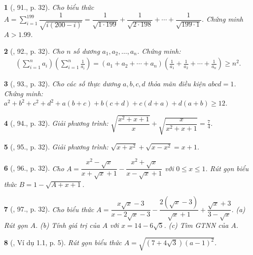 \documentclass{article}
\newtheorem{baitoan}{}%
\begin{document}
\begin{baitoan}[\cite{Tuyen_Toan_9_old}, 91., p. 32]
	Cho biểu thức $A = \sum_{i=1}^{199} \dfrac{1}{\sqrt{i(200 - i)}} = \dfrac{1}{\sqrt{1\cdot199}} + \dfrac{1}{\sqrt{2\cdot198}} + \cdots + \dfrac{1}{\sqrt{199\cdot1}}$. Chứng minh $A > 1.99$.
\end{baitoan}

\begin{baitoan}[\cite{Tuyen_Toan_9_old}, 92., p. 32]
	Cho $n$ số dương $a_1,a_2,\ldots,a_n$. Chứng minh:
	\begin{align*}
		\left(\sum_{i=1}^n a_i\right)\left(\sum_{i=1}^n \frac{1}{a_i}\right) = (a_1 + a_2 + \cdots + a_n)\left(\frac{1}{a_1} + \frac{1}{a_2} + \cdots + \frac{1}{a_n}\right)\ge n^2.
	\end{align*}
\end{baitoan}

\begin{baitoan}[\cite{Tuyen_Toan_9_old}, 93., p. 32]
	Cho các số thực dương $a,b,c,d$ thỏa mãn điều kiện $abcd = 1$. Chứng minh: $a^2 + b^2 + c^2 + d^2+ a(b + c) + b(c + d) + c(d + a) + d(a + b)\ge12$.
\end{baitoan}

\begin{baitoan}[\cite{Tuyen_Toan_9_old}, 94., p. 32]
	Giải phương trình: $\sqrt{\dfrac{x^2 + x + 1}{x}} + \sqrt{\dfrac{x}{x^2 + x + 1}} = \frac{7}{4}$.
\end{baitoan}

\begin{baitoan}[\cite{Tuyen_Toan_9_old}, 95., p. 32]
	Giải phương trình: $\sqrt{x + x^2} + \sqrt{x - x^2} = x + 1$.
\end{baitoan}

\begin{baitoan}[\cite{Tuyen_Toan_9_old}, 96., p. 32]
	Cho $A = \dfrac{x^2 - \sqrt{x}}{x + \sqrt{x} + 1} - \dfrac{x^2 + \sqrt{x}}{x - \sqrt{x} + 1}$ với $0\le x\le 1$. Rút gọn biểu thức $B = 1 - \sqrt{A + x + 1}$.
\end{baitoan}

\begin{baitoan}[\cite{Tuyen_Toan_9_old}, 97., p. 32]
	Cho biểu thức $A = \dfrac{x\sqrt{x} - 3}{x - 2\sqrt{x} - 3} - \dfrac{2(\sqrt{x} - 3)}{\sqrt{x} + 1} + \dfrac{\sqrt{x} + 3}{3 - \sqrt{x}}$. (a) Rút gọn $A$. (b) Tính giá trị của $A$ với $x = 14 - 6\sqrt{5}$. (c) Tìm {\rm GTNN} của $A$.
\end{baitoan}

\begin{baitoan}[\cite{TLCT_THCS_Toan_9_dai_so}, Ví dụ 1.1, p. 5]
	Rút gọn biểu thức $A = \sqrt{(7 + 4\sqrt{3})(a - 1)^2}$.
\end{baitoan}
\end{document}
